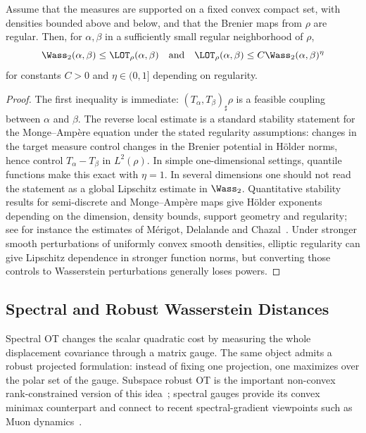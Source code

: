 \begin{prop}\label{prop-linear-ot-stability}
	Assume that the measures are supported on a fixed convex compact set, with densities bounded above and below, and that the Brenier maps from $\rho$ are regular. Then, for $\alpha,\beta$ in a sufficiently small regular neighborhood of $\rho$,
	\[
		\Wass_2(\alpha,\beta)\leq \LOT_\rho(\alpha,\beta)
		\quad\text{and}\quad
		\LOT_\rho(\alpha,\beta)\leq C\Wass_2(\alpha,\beta)^\eta
	\]
	for constants $C>0$ and $\eta\in(0,1]$ depending on regularity.
\end{prop}
\begin{proof}
	The first inequality is immediate: $(T_\alpha,T_\beta)_\sharp\rho$ is a feasible coupling between $\alpha$ and $\beta$. The reverse local estimate is a standard stability statement for the Monge--Amp\`ere equation under the stated regularity assumptions: changes in the target measure control changes in the Brenier potential in H\"older norms, hence control $T_\alpha-T_\beta$ in $L^2(\rho)$. In simple one-dimensional settings, quantile functions make this exact with $\eta=1$.
	In several dimensions one should not read the statement as a global Lipschitz estimate in $\Wass_2$. Quantitative stability results for semi-discrete and Monge--Amp\`ere maps give H\"older exponents depending on the dimension, density bounds, support geometry and regularity; see for instance the estimates of M\'erigot, Delalande and Chazal~\cite{merigot2020stability}. Under stronger smooth perturbations of uniformly convex smooth densities, elliptic regularity can give Lipschitz dependence in stronger function norms, but converting those controls to Wasserstein perturbations generally loses powers.
\end{proof}

\subsection{Spectral and Robust Wasserstein Distances}
\label{sec-spectral-subspace-wasserstein}

Spectral OT changes the scalar quadratic cost by measuring the whole displacement covariance through a matrix gauge. The same object admits a robust projected formulation: instead of fixing one projection, one maximizes over the polar set of the gauge. Subspace robust OT is the important non-convex rank-constrained version of this idea~\cite{paty2019subspace}; spectral gauges provide its convex minimax counterpart and connect to recent spectral-gradient viewpoints such as Muon dynamics~\cite{peyre2026muon}.

